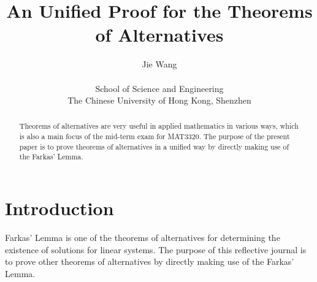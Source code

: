 \documentclass[12pt]{article}
\title{An Unified Proof for the Theorems of Alternatives}
\author
{Jie Wang\\
\\
\normalsize{School of Science and Engineering}\\
\normalsize{The Chinese University of Hong Kong, Shenzhen}
}
\date{}
\begin{document}
 


\baselineskip22pt


\maketitle 




\begin{abstract}
Theorems of alternatives are very useful in applied mathematics in various ways, which is also a main focus of the mid-term exam for MAT3320.
The purpose of the present paper is to prove theorems of alternatives in a unified way by directly making use of the Farkas' Lemma.
\end{abstract}




\section{Introduction}
Farkas' Lemma is one of the theorems of alternatives for determining the existence of solutions for linear systems.
The purpose of this reflective journal is to prove other theorems of alternatives by directly making use of the Farkas' Lemma.
\end{document}
